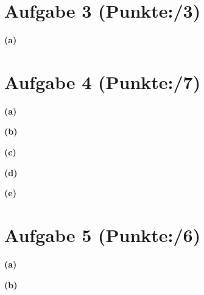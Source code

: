 \documentclass[11pt, a4paper]{article}
\newcommand{\pp}{3}
\newcommand{\ppp}{7}
\newcommand{\pppp}{6}
\begin{document}
\section*{Aufgabe 3 (Punkte:\qquad/\pp)}
\textbf{(a)}
\begin{adjustwidth}{20pt}{20pt}
	
\end{adjustwidth}




\section*{Aufgabe 4 (Punkte:\qquad/\ppp)}
\textbf{(a)}
\begin{adjustwidth}{20pt}{20pt}

\end{adjustwidth}
\textbf{(b)}
\begin{adjustwidth}{20pt}{20pt}

\end{adjustwidth}
\textbf{(c)}
\begin{adjustwidth}{20pt}{20pt}

\end{adjustwidth}
\textbf{(d)}
\begin{adjustwidth}{20pt}{20pt}

\end{adjustwidth}
\textbf{(e)}
\begin{adjustwidth}{20pt}{20pt}

\end{adjustwidth}



\section*{Aufgabe 5 (Punkte:\qquad/\pppp)}
\textbf{(a)}
\begin{adjustwidth}{20pt}{20pt}
	
\end{adjustwidth}
\textbf{(b)}
\begin{adjustwidth}{20pt}{20pt}
	
\end{adjustwidth}
\end{document}
